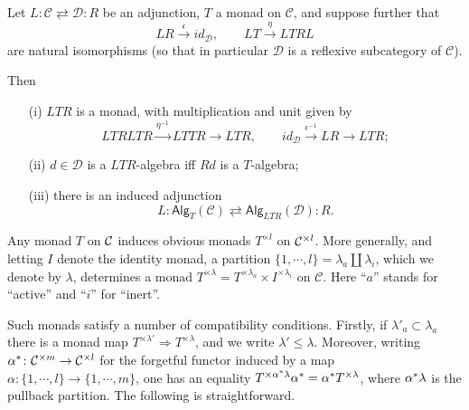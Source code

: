 \documentclass[a4paper,10pt]{article}%
\begin{document}
\begin{proposition}\label{MONADADJ PROP}
Let
$
L \colon \mathcal{C} \rightleftarrows \mathcal{D} \colon R
$
be an adjunction, $T$ a monad on $\mathcal{C}$, and suppose further that
\[
	LR \xrightarrow{\epsilon} id_{\mathcal{D}}, 
\qquad
	LT \xrightarrow{\eta} LTRL
\]
are natural isomorphisms 
(so that in particular $\mathcal{D}$ is a reflexive subcategory of $\mathcal{C}$).

Then
\begin{itemize}
\item[(i)] $LTR$ is a monad, with multiplication and unit given by
\[LTRLTR \xrightarrow{\eta^{-1}} LTTR \to LTR,\qquad
id_{\mathcal{D}} \xrightarrow{\epsilon^{-1}} LR \to LTR;
\]
\item[(ii)]
$d \in \mathcal{D}$ is a $LTR$-algebra iff $Rd$ is a $T$-algebra;
\item[(iii)] there is an induced adjunction
\[
L \colon \mathsf{Alg}_{T}(\mathcal{C})
	\rightleftarrows
\mathsf{Alg}_{LTR}(\mathcal{D}) \colon R.
\]
\end{itemize}
\end{proposition}



Any monad $T$ on $\mathcal{C}$ induces obvious monads $T^{\times l}$ on $\mathcal{C}^{\times l}$.
More generally, and 
letting $I$ denote the identity monad,
a partition 
$\{1,\cdots,l\} = \lambda_a \amalg \lambda_i$,
which we denote by $\lambda$,
determines a monad 
$T^{\times \lambda} = T^{\times \lambda_a} \times I^{\times \lambda_i}$ on $\mathcal{C}$.
Here ``$a$'' stands for ``active'' and ``$i$'' for ``inert''.

Such monads satisfy a number of compatibility conditions. 
Firstly, if $\lambda'_a \subset \lambda_a$
there is a monad map
$T^{\times \lambda'} \Rightarrow T^{\times \lambda}$,
and we write $\lambda' \leq \lambda$.
Moreover, writing $\alpha^{\**} \colon 
\C^{\times m} \to \C^{\times l}$
for the forgetful functor induced by
a map $\alpha \colon \{1,\cdots,l\} \to \{1,\cdots,m\}$,
one has an equality
$T^{\times \alpha^{\**}\lambda} \alpha^{\**} =
\alpha^{\**} T^{\times \lambda}$,
where $\alpha^{\**}\lambda$ is the pullback partition.
The following is straightforward.
\end{document}
